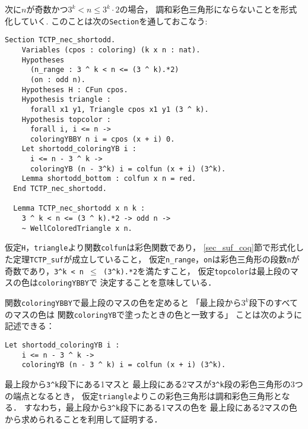 次に$n$が奇数かつ$3^{k} < n \leq 3^{k} \cdot 2$の場合，
調和彩色三角形にならないことを形式化していく.
このことは次の{\tt{Section}}を通しておこなう:
\begin{lstlisting}[language=Coq]
  Section TCTP_nec_shortodd.
    Variables (cpos : coloring) (k x n : nat).
    Hypotheses
      (n_range : 3 ^ k < n <= (3 ^ k).*2)
      (on : odd n).
    Hypotheses H : CFun cpos.
    Hypothesis triangle :
      forall x1 y1, Triangle cpos x1 y1 (3 ^ k).
    Hypothesis topcolor :
      forall i, i <= n ->
      coloringYBBY n i = cpos (x + i) 0.
    Let shortodd_coloringYB i :
      i <= n - 3 ^ k ->
      coloringYB (n - 3^k) i = colfun (x + i) (3^k).
    Lemma shortodd_bottom : colfun x n = red.
  End TCTP_nec_shortodd.

  Lemma TCTP_nec_shortodd x n k :
    3 ^ k < n <= (3 ^ k).*2 -> odd n ->
    ~ WellColoredTriangle x n.
\end{lstlisting}
仮定{\tt{H}}，{\tt{triangle}}より関数{\tt{colfun}}は彩色関数であり，
\ref{sec_suf_coq}節で形式化した定理{\tt{TCTP\_suf}}が成立していること，
仮定{\tt{n\_range}}，{\tt{on}}は彩色三角形の段数{\tt{n}}が
奇数であり，{\tt{3\verb|^|k < n $\leq$ (3\verb|^|k).*2}}を満たすこと，
仮定{\tt{topcolor}}は最上段のマスの色は{\tt{coloringYBBY}}で
決定することを意味している．

関数{\tt{coloringYBBY}}で最上段のマスの色を定めると
「最上段から$3^k$段下のすべてのマスの色は
  関数{\tt{coloringYB}}で塗ったときの色と一致する」
ことは次のように記述できる：
\begin{lstlisting}[language=Coq]
  Let shortodd_coloringYB i :
    i <= n - 3 ^ k ->
    coloringYB (n - 3 ^ k) i = colfun (x + i) (3^k).
\end{lstlisting}
最上段から{\tt{3\verb|^|k}}段下にある1マスと
最上段にある2マスが{\tt{3\verb|^|k}}段の彩色三角形の3つの端点となるとき，
仮定{\tt{triangle}}よりこの彩色三角形は調和彩色三角形となる．
すなわち，最上段から{\tt{3\verb|^|k}}段下にある1マスの色を
最上段にある2マスの色から求められることを利用して証明する．

